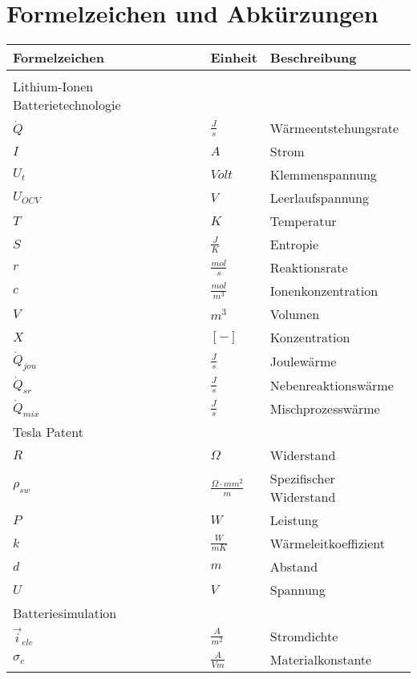 \section{Formelzeichen und Abkürzungen}
\hspace{0.7cm}
\begin{tabularx}{15.1cm}{llX}
	\textbf{Formelzeichen} & \textbf{Einheit} & \textbf{Beschreibung} \\
	\hline \\ [-0.2cm]
	Lithium-Ionen Batterietechnologie&&\\ [0.1cm] 
	\hline
	$\dot{Q}$ & $\frac{J}{s}$ & Wärmeentstehungsrate\\ [0.1cm]
	$I$ & $A$ & Strom\\ [0.1cm]
	$U_{t}$ & $Volt$ & Klemmenspannung\\ [0.1cm]
	$U_{OCV}$ & $V$ & Leerlaufspannung\\ [0.1cm]
	$T$ & $K$ & Temperatur\\ [0.1cm]
	$S$ & $\frac{J}{K}$ & Entropie\\ [0.1cm]
	$r$ & $\frac{mol}{s}$ & Reaktionsrate\\ [0.1cm]
	$c$ & $\frac{mol}{m^{3}}$ & Ionenkonzentration\\ [0.1cm]
	$V$ & $m^{3}$ & Volumen\\ [0.1cm]
	$X$ & $[-]$ & Konzentration\\ [0.1cm]
	$\dot{Q}_{jou}$ & $\frac{J}{s}$ & Joulewärme\\ [0.1cm]
	$\dot{Q}_{sr}$ & $\frac{J}{s}$ & Nebenreaktionswärme\\ [0.1cm]
	$\dot{Q}_{mix}$ & $\frac{J}{s}$ & Mischprozesswärme\\ [0.1cm]
	\hline
	Tesla Patent && \\ [0.1cm]
	\hline
	$R$ & $\Omega$ & Widerstand\\ [0.1cm]
	$\rho_{sw}$ & $\frac{\Omega\cdot mm^{2}}{m}$ & Spezifischer Widerstand\\ [0.1cm]
	$P$ & $W$ & Leistung\\ [0.1cm]
	$k$ & $\frac{W}{mK}$ & Wärmeleitkoeffizient\\ [0.1cm]
	$d$ & $m$ & Abstand\\ [0.1cm]
	$U$ & $V$ & Spannung\\ [0.1cm]
	\hline
	Batteriesimulation & & \\ [0.1cm]
	\hline
	$\vec{i}_{ele}$ & $\frac{A}{m^{2}}$ & Stromdichte\\ [0.1cm]
	$\sigma_{c}$ & $\frac{A}{Vm}$ & Materialkonstante\\ [0.1cm]

\end{tabularx}
